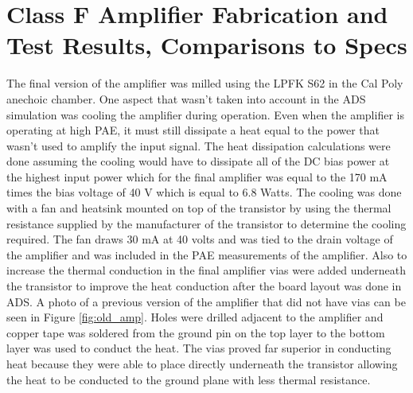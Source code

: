 ﻿\chapter{Class F Amplifier Fabrication and Test Results, Comparisons to Specs}

The final version of the amplifier was milled using the LPFK S62 in the Cal Poly anechoic chamber. One aspect that wasn't taken into account in the ADS simulation was cooling the amplifier during operation. Even when the amplifier is operating at high PAE, it must still dissipate a heat equal to the power that wasn't used to amplify the input signal. The heat dissipation calculations were done assuming the cooling would have to dissipate all of the DC bias power at the highest input power which for the final amplifier was equal to the 170 mA times the bias voltage of 40 V which is equal to 6.8 Watts. The cooling was done with a fan and heatsink mounted on top of the transistor by using the thermal resistance supplied by the manufacturer of the transistor to determine the cooling required. The fan draws 30 mA at 40 volts and was tied to the drain voltage of the amplifier and was included in the PAE measurements of the amplifier. Also to increase the thermal conduction in the final amplifier vias were added underneath the transistor to improve the heat conduction after the board layout was done in ADS. A photo of a previous version of the amplifier that did not have vias can be seen in Figure \ref{fig:old_amp}. Holes were drilled adjacent to the amplifier and copper tape was soldered from the ground pin on the top layer to the bottom layer was used to conduct the heat. The vias proved far superior in conducting heat because they were able to place directly underneath the transistor allowing the heat to be conducted to the ground plane with less thermal resistance.

